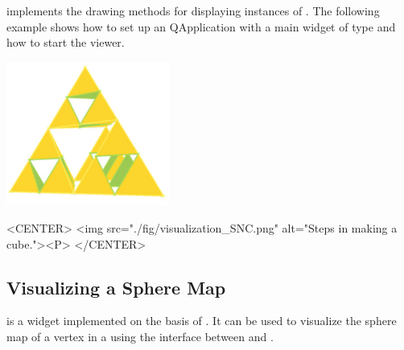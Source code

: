  implements the drawing methods for displaying 
instances of
. The following example shows how to set up 
an QApplication with a main widget of type  and
how to start the viewer.

\begin{ccTexOnly}
    \begin{center}
      \parbox{0.4\textwidth}{%
          \includegraphics[width=0.4\textwidth]{Nef_3/fig/visualization_SNC}%
      }
    \end{center}
\end{ccTexOnly}

\begin{ccHtmlOnly}
    <CENTER>
       <img src="./fig/visualization_SNC.png" alt="Steps in making a cube."><P>
    </CENTER>
\end{ccHtmlOnly}



\subsection{Visualizing a Sphere Map}

 is a widget implemented on the basis of 
. It can be used to visualize the sphere map 
of a vertex in a  using the interface between
 and .


